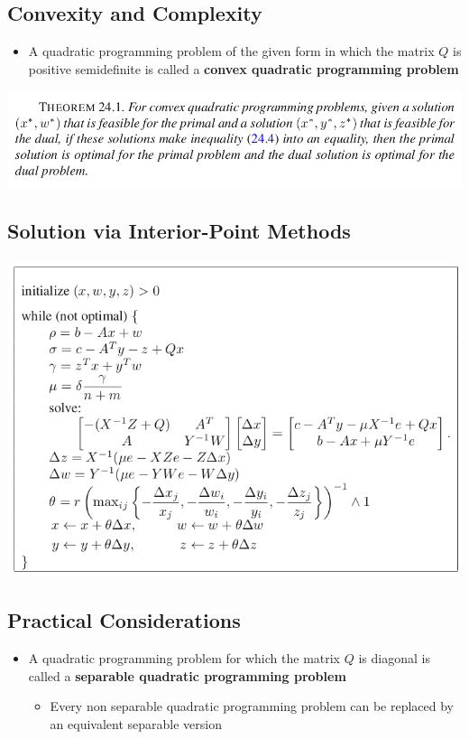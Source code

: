 \documentclass[11pt]{article}
\begin{document}
\subsection{Convexity and Complexity}
\label{sec:orgc3113cb}
\begin{itemize}
\item A quadratic programming problem of the given form in which the matrix \(Q\) is positive semidefinite is called a \textbf{convex quadratic programming problem}
\end{itemize}

\begin{center}
\includegraphics[width=.9\linewidth]{Quadratic Programming/screenshot_2019-03-17_15-42-59.png}
\end{center}

\subsection{Solution via Interior-Point Methods}
\label{sec:orgec4abd5}
\begin{center}
\includegraphics[width=.9\linewidth]{Quadratic Programming/screenshot_2019-03-17_15-50-46.png}
\end{center}

\subsection{Practical Considerations}
\label{sec:org4bc1d1b}
\begin{itemize}
\item A quadratic programming problem for which the matrix \(Q\) is diagonal is called a \textbf{separable quadratic programming problem}
\begin{itemize}
\item Every non separable quadratic programming problem can be replaced by an equivalent separable version
\end{itemize}
\end{itemize}
\end{document}
